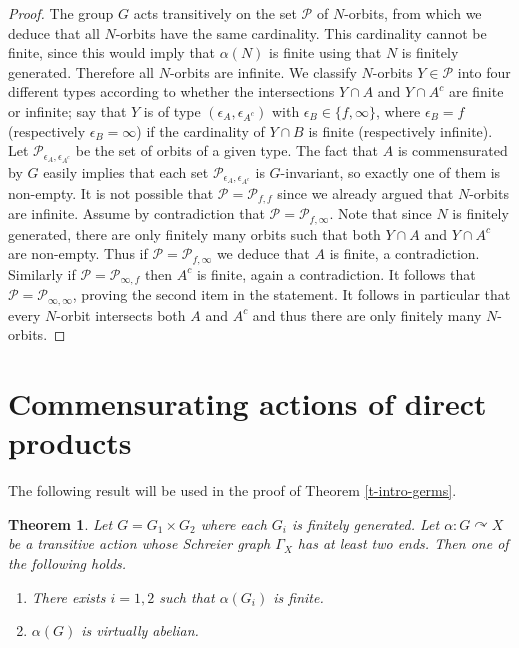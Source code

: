 \documentclass[11pt]{amsart}
\newcommand{\acts}{\ensuremath{\curvearrowright}}%
\theoremstyle{definition}
\theoremstyle{plain}
\newtheorem{thm}[defin]{Theorem}
\newtheorem{main thm}{Theorem}
\theoremstyle{remark}
\theoremstyle{plain}
\begin{document}
		\begin{proof}
	The group $G$ acts transitively on the set $\mathcal{P}$ of $N$-orbits, from which we deduce that all $N$-orbits have the same cardinality. This cardinality cannot be finite, since this would imply that $\alpha(N)$ is finite using that $N$ is finitely generated. Therefore all $N$-orbits are infinite.  We classify $N$-orbits $Y\in  \mathcal{P}$ into four different types according to whether the intersections $Y\cap A$ and $Y\cap A^c$ are finite  or infinite; say that $Y$ is of type $(\epsilon_A, \epsilon_{A^c})$ with $\epsilon_B\in \{f, \infty\}$, where $\epsilon_B=f$ (respectively $\epsilon_B=\infty$) if  the cardinality of $Y\cap B$ is finite (respectively infinite). Let $\mathcal{P}_{\epsilon_A, \epsilon_{A^c}}$ be the set of orbits of a given type.  The fact that $A$ is commensurated by $G$ easily implies that each set $\mathcal{P}_{\epsilon_A, \epsilon_{A^c}}$ is $G$-invariant, so exactly one of them is non-empty.  It is not possible that  $\mathcal{P}=\mathcal{P}_{f, f}$ since we already argued that $N$-orbits are infinite. Assume by contradiction that $\mathcal{P}=\mathcal{P}_{f,\infty}$. Note that since $N$ is finitely generated, there are only finitely many orbits such that both $Y\cap A$ and $Y\cap A^c$ are non-empty. Thus if $\mathcal{P}=\mathcal{P}_{f, \infty}$ we deduce that $A$ is finite, a contradiction. Similarly if $\mathcal{P}=\mathcal{P}_{\infty, f}$ then $A^c$ is finite, again a contradiction. It follows that $\mathcal{P}=\mathcal{P}_{\infty, \infty}$, proving the second item in the statement. It follows in particular that every $N$-orbit intersects both $A$ and $A^c$ and thus there are only finitely many $N$-orbits.		\end{proof}
			
	


\section{Commensurating actions of direct products} \label{s-products}
	The following result will be used in the proof of Theorem \ref{t-intro-germs}.
	\begin{thm} \label{t-commensurating-product-discrete}
	Let $G=G_1\times G_2$ where each $G_i$ is  finitely generated. Let $\alpha \colon G\acts X$ be a transitive action whose Schreier graph $\Gamma_X$ has at least two ends. Then  one of the following holds.
	\begin{enumerate}[label=(\roman*)]
	\item There exists $i=1, 2$ such that $\alpha(G_i)$ is finite. 
	\item   $\alpha(G)$ is virtually abelian.  
	\end{enumerate}
	\end{thm}
	
\end{document}
